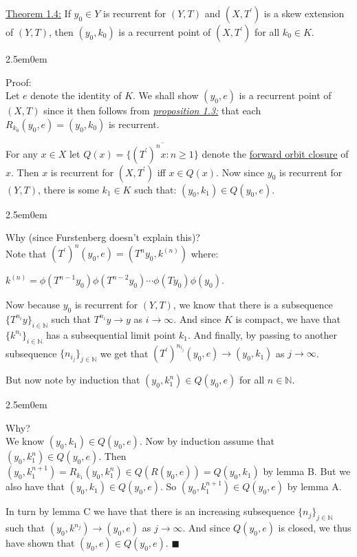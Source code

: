\documentclass{book}
\newcommand{\inLinkRap}[2]{{\color{blue}\hyperlink{#1}{\textit{#2}}}}
\newcommand{\exTwo}{%
   \color{Purple}%
   \fontsize{13}{15}\selectfont%
}
\newcommand{\exThreeP}{%
   \color{RedViolet}%
   \fontsize{12}{14}\selectfont%
}
\newcommand{\exPPP}{%
   \color{VioletRed}%
   \fontsize{12}{14}\selectfont%
}
\newenvironment{myIndent}{%
   \begin{adjustwidth}{2.5em}{0em}%
}{%
   \end{adjustwidth}%
}
\newcommand{\udefine}[1]{{%
   \setulcolor{Red}%
   \setul{0.14em}{0.07em}%
   \ul{#1}%
}}
\newcommand{\retTwo}{\hfill\bigbreak}
\begin{document}
\exTwo\ul{Theorem 1.4:} If $y_0 \in Y$ is recurrent for $(Y, T)$ and $(X, T^\prime)$ is a skew extension of $(Y, T)$, then $(y_0, k_0)$ is a recurrent point of $(X, T^\prime)$ for all $k_0 \in K$.
\begin{myIndent}\exThreeP
	Proof:\\
	Let $e$ denote the identity of $K$. We shall show $(y_0, e)$ is a recurrent point of $(X, T)$ since it then follows from \inLinkRap{Furstenberg proposition 1.3}{proposition 1.3:} that each $R_{k_0}(y_0, e) = (y_0, k_0)$ is recurrent.\retTwo

	For any $x \in X$ let $Q(x) = \overline{\{(T^\prime)^n x : n \geq 1\}}$ denote the \udefine{forward orbit closure} of $x$. Then $x$ is recurrent for $(X, T^\prime)$ iff $x \in Q(x)$. Now since $y_0$ is recurrent for $(Y, T)$, there is some $k_1 \in K$ such that: $(y_0, k_1) \in Q(y_0, e)$.

	\begin{myIndent}\exPPP
		Why (since Furstenberg doesn't explain this)?\\ [4pt]
		Note that $(T^\prime)^n(y_0, e) = (T^n y_0, k^{(n)})$ where:
		
		{\centering$k^{(n)} = \phi(T^{n-1} y_0 ) \phi( T^{n-2} y_0) \cdots \phi(T y_0)\phi(y_0)$.\retTwo\par}

		Now because $y_0$ is recurrent for $(Y, T)$, we know that there is a subsequence\\ $\{T^{n_i} y\}_{i \in \mathbb{N}}$ such that $T^{n_i} y \to y$ as $i \to \infty$. And since $K$ is compact, we have that $\{k^{n_{i}}\}_{i \in \mathbb{N}}$ has a subsequential limit point $k_1$. And finally, by passing to another subsequence $\{n_{i_j}\}_{j \in \mathbb{N}}$ we get that $(T^\prime)^{n_{i_j}}(y_0, e) \to (y_0, k_1)$ as $j \to \infty$.\newpage
	\end{myIndent}

	But now note by induction that $(y_0, k_1^n) \in Q(y_0, e)$ for all $n \in \mathbb{N}$.

	\begin{myIndent}\exPPP
		Why?\\
		We know $(y_0, k_1) \in Q(y_0, e)$. Now by induction assume that $(y_0, k_1^n) \in Q(y_0, e)$. Then $(y_0, k_1^{n+1}) = R_{k_1}(y_0, k_1^n)  \in Q(R(y_0, e)) = Q(y_0, k_1)$ by lemma B. But we also have that $(y_0, k_1) \in Q(y_0, e)$. So $(y_0, k_1^{n+1}) \in Q(y_0, e)$ by lemma A.\retTwo
	\end{myIndent}

	In turn by lemma C we have that there is an increasing subsequence $\{n_j\}_{j \in \mathbb{N}}$ such that $(y_0, k^{n_j}) \to (y_0, e)$ as $j \to \infty$. And since $Q(y_0, e)$ is closed, we thus have shown that $(y_0, e) \in Q(y_0, e)$. $\blacksquare$\retTwo
\end{myIndent}
\end{document}
